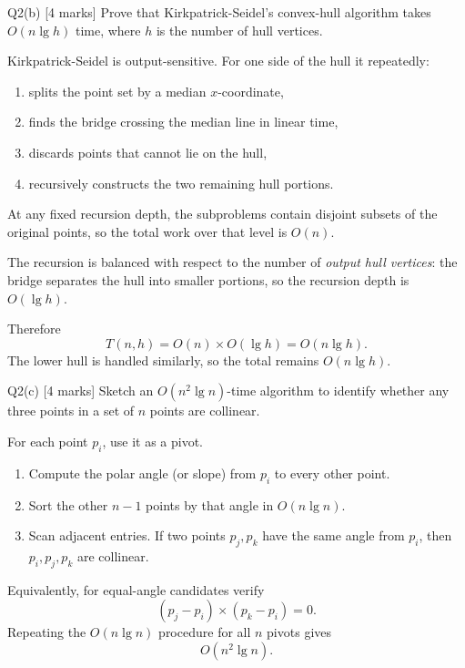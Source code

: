 \documentclass[10.5pt,a4paper]{article}
\begin{document}
\begin{questionbox}{Q2(b) [4 marks]}
Prove that Kirkpatrick-Seidel's convex-hull algorithm takes \(O(n\lg h)\) time, where \(h\) is the number of hull vertices.
\end{questionbox}

\begin{answerbox}
Kirkpatrick-Seidel is output-sensitive. For one side of the hull it repeatedly:
\begin{enumerate}[leftmargin=6mm]
\item splits the point set by a median \(x\)-coordinate,
\item finds the bridge crossing the median line in linear time,
\item discards points that cannot lie on the hull,
\item recursively constructs the two remaining hull portions.
\end{enumerate}

At any fixed recursion depth, the subproblems contain disjoint subsets of the original points, so the total work over that level is \(O(n)\).

The recursion is balanced with respect to the number of \emph{output hull vertices}: the bridge separates the hull into smaller portions, so the recursion depth is \(O(\lg h)\).

Therefore
\[
T(n,h)=O(n)\times O(\lg h)=\boxed{O(n\lg h)}.
\]
The lower hull is handled similarly, so the total remains \(O(n\lg h)\).
\end{answerbox}

\begin{questionbox}{Q2(c) [4 marks]}
Sketch an \(O(n^2\lg n)\)-time algorithm to identify whether any three points in a set of \(n\) points are collinear.
\end{questionbox}

\begin{answerbox}
For each point \(p_i\), use it as a pivot.
\begin{enumerate}[leftmargin=6mm]
\item Compute the polar angle (or slope) from \(p_i\) to every other point.
\item Sort the other \(n-1\) points by that angle in \(O(n\lg n)\).
\item Scan adjacent entries. If two points \(p_j,p_k\) have the same angle from \(p_i\), then \(p_i,p_j,p_k\) are collinear.
\end{enumerate}
Equivalently, for equal-angle candidates verify
\[
(p_j-p_i)\times(p_k-p_i)=0.
\]
Repeating the \(O(n\lg n)\) procedure for all \(n\) pivots gives
\[
\boxed{O(n^2\lg n)}.
\]
\end{answerbox}
\end{document}
